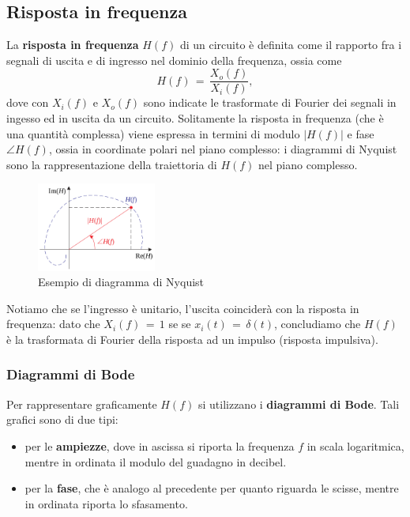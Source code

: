 \subsection{Risposta in frequenza}

La \textbf{risposta in frequenza} $H\left(f\right)$ di un circuito è definita come il rapporto fra i segnali di uscita e di
ingresso nel dominio della frequenza, ossia come
\begin{equation}
    H\left(f\right)\,=\,\frac{X_o(f)}{X_i(f)},
    \label{equation: rispostaFrequenza}
\end{equation}
dove con $X_i\left(f\right)$ e $X_o\left(f\right)$ sono indicate le trasformate di Fourier dei segnali in ingesso ed in uscita 
da un circuito. Solitamente la risposta in frequenza (che è una quantità complessa) viene espressa in termini di modulo 
$|H\left(f\right)|$ e fase $\angle H\left(f\right)$, ossia in coordinate polari nel piano complesso: i diagrammi di Nyquist 
sono la rappresentazione della traiettoria di $H\left(f\right)$ nel piano complesso.
\begin{figure}[H]
    \centering
    \includegraphics[width=0.35\textwidth]{Immagini/DiagrammaNyquist.png}
    \caption{Esempio di diagramma di Nyquist}
    \label{figure: Impedenza}
\end{figure}
Notiamo che se l'ingresso è unitario, l'uscita coinciderà con la risposta in frequenza: dato che $X_i\left(f\right)\,=\,1$ se
se $x_i\left(t\right)\,=\,\delta\left(t\right)$, concludiamo che $H\left(f\right)$ è la trasformata di Fourier della risposta
ad un impulso (risposta impulsiva).

\subsubsection{Diagrammi di Bode}

Per rappresentare graficamente $H\left(f\right)$ si utilizzano i \textbf{diagrammi di Bode}. Tali grafici sono di due tipi:
\begin{itemize}
    \item per le \textbf{ampiezze}, dove in ascissa si riporta la frequenza $f$ in scala logaritmica, mentre in ordinata il
          modulo del guadagno in decibel.
    \item per la \textbf{fase}, che è analogo al precedente per quanto riguarda le scisse, mentre in ordinata riporta lo 
          sfasamento.
\end{itemize}

